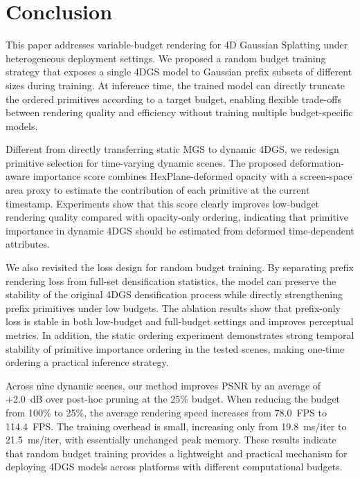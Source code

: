 \documentclass[pdflatex,sn-mathphys]{sn-jnl}
\begin{document}
\section{Conclusion}
\label{sec:conclusion}

This paper addresses variable-budget rendering for 4D Gaussian Splatting under heterogeneous deployment settings. We proposed a random budget training strategy that exposes a single 4DGS model to Gaussian prefix subsets of different sizes during training. At inference time, the trained model can directly truncate the ordered primitives according to a target budget, enabling flexible trade-offs between rendering quality and efficiency without training multiple budget-specific models.

Different from directly transferring static MGS to dynamic 4DGS, we redesign primitive selection for time-varying dynamic scenes. The proposed deformation-aware importance score combines HexPlane-deformed opacity with a screen-space area proxy to estimate the contribution of each primitive at the current timestamp. Experiments show that this score clearly improves low-budget rendering quality compared with opacity-only ordering, indicating that primitive importance in dynamic 4DGS should be estimated from deformed time-dependent attributes.

We also revisited the loss design for random budget training. By separating prefix rendering loss from full-set densification statistics, the model can preserve the stability of the original 4DGS densification process while directly strengthening prefix primitives under low budgets. The ablation results show that prefix-only loss is stable in both low-budget and full-budget settings and improves perceptual metrics. In addition, the static ordering experiment demonstrates strong temporal stability of primitive importance ordering in the tested scenes, making one-time ordering a practical inference strategy.

Across nine dynamic scenes, our method improves PSNR by an average of +2.0~dB over post-hoc pruning at the 25\% budget. When reducing the budget from 100\% to 25\%, the average rendering speed increases from 78.0~FPS to 114.4~FPS. The training overhead is small, increasing only from 19.8~ms/iter to 21.5~ms/iter, with essentially unchanged peak memory. These results indicate that random budget training provides a lightweight and practical mechanism for deploying 4DGS models across platforms with different computational budgets.
\end{document}

